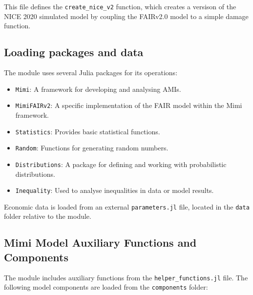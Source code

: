 \documentclass[
]{article}
\providecommand{\tightlist}{%
  \setlength{\itemsep}{0pt}\setlength{\parskip}{0pt}}
\begin{document}
This file defines the \texttt{create\_nice\_v2} function, which creates
a versison of the NICE 2020 simulated model by coupling the FAIRv2.0
model to a simple damage function.

\subsection{Loading packages and data}\label{loading-packages-and-data}

The module uses several Julia packages for its operations:

\begin{itemize}
\tightlist
\item
  \texttt{Mimi}: A framework for developing and analysing AMIs.
\item
  \texttt{MimiFAIRv2}: A specific implementation of the FAIR model
  within the Mimi framework.
\item
  \texttt{Statistics}: Provides basic statistical functions.
\item
  \texttt{Random}: Functions for generating random numbers.
\item
  \texttt{Distributions}: A package for defining and working with
  probabilistic distributions.
\item
  \texttt{Inequality}: Used to analyse inequalities in data or model
  results.
\end{itemize}

Economic data is loaded from an external \texttt{parameters.jl} file,
located in the \texttt{data} folder relative to the module.

\subsection{Mimi Model Auxiliary Functions and
Components}\label{mimi-model-auxiliary-functions-and-components}

The module includes auxiliary functions from the
\texttt{helper\_functions.jl} file. The following model components are
loaded from the \texttt{components} folder:
\end{document}
